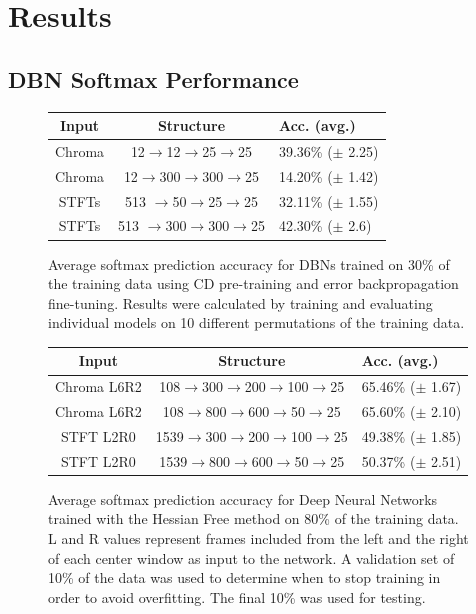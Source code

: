 \documentclass{article}
\begin{document}
\section{Results}
\label{sec:results}

\subsection{DBN Softmax Performance}

\begin{figure}
\begin{tabular}{c|c|l}
Input & Structure & Acc. (avg.) \\
\hline
Chroma & 12$\rightarrow$12$\rightarrow$25$\rightarrow$25 & 39.36\% ($\pm$ 2.25) \\
Chroma & 12$\rightarrow$300$\rightarrow$300$\rightarrow$25 & 14.20\% ($\pm$ 1.42) \\
STFTs & 513 $\rightarrow$50$\rightarrow$25$\rightarrow$25 & 32.11\% ($\pm$ 1.55) \\
STFTs & 513 $\rightarrow$300$\rightarrow$300$\rightarrow$25 & 42.30\% ($\pm$ 2.6) \\
\end{tabular}

\caption{Average softmax prediction accuracy for DBNs trained on 30\% of the
training data using CD pre-training and error backpropagation fine-tuning.
Results were calculated by training and evaluating individual models on 10
different permutations of the training data.}

\end{figure}

\begin{figure}
\begin{tabular}{c|c|l}
Input & Structure & Acc. (avg.) \\
\hline
Chroma L6R2 & 108$\rightarrow$300$\rightarrow$200$\rightarrow$100$\rightarrow$25 & 65.46\% ($\pm$ 1.67) \\
Chroma L6R2 & 108$\rightarrow$800$\rightarrow$600$\rightarrow$50$\rightarrow$25 & 65.60\% ($\pm$ 2.10) \\
STFT L2R0 & 1539$\rightarrow$300$\rightarrow$200$\rightarrow$100$\rightarrow$25 & 49.38\% ($\pm$ 1.85) \\
STFT L2R0 & 1539$\rightarrow$800$\rightarrow$600$\rightarrow$50$\rightarrow$25 & 50.37\% ($\pm$ 2.51) \\
\end{tabular}
\caption{
  Average softmax prediction accuracy for Deep Neural Networks trained with the
  Hessian Free method on 80\% of the training data. L and R values represent
  frames included from the left and the right of each center window as input to
  the network. A validation set of 10\% of the data was used to determine when
  to stop training in order to avoid overfitting. The final 10\% was used for
  testing.
}

\end{figure}
\end{document}
